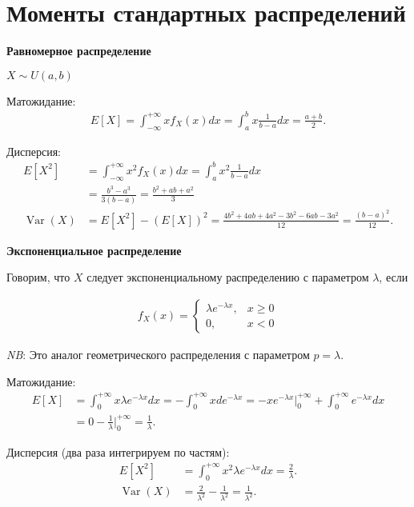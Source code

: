 \documentclass[12pt]{article}
\DeclareMathOperator{\Var}{Var}
\begin{document}
  \section{Моменты стандартных распределений}

  \textbf{Равномерное распределение}

  $X \sim U(a, b)$ 

  Матожидание:
  \begin{align*}
    E[X] = \int_{-\infty}^{+\infty} x f_X(x) dx = \int_{a}^{b} x \frac{1}{b - a} dx = \frac{a + b}{2}. 
  \end{align*}

  Дисперсия:
  \begin{align*}
    E[X^2] &= \int_{-\infty}^{+\infty} x^2 f_X(x) dx = \int_{a}^{b} x^2 \frac{1}{b - a} dx \\
           &= \frac{b^3 - a^3}{3(b - a)} = \frac{b^2 + ab + a^2}{3}\\
    \Var(X) &= E[X^2] - (E[X])^2 = \frac{4b^2 + 4ab + 4a^2 - 3b^2 - 6ab - 3a^2}{12} = \frac{(b - a)^2}{12}. 
  \end{align*}

  \textbf{Экспоненциальное распределение}

  Говорим, что $X$ следует экспоненциальному распределению с параметром $\lambda$, если

  \begin{align*}
    f_X(x) = \begin{cases}
      \lambda e^{-\lambda x}, &x \ge 0 \\
      0, &x < 0
    \end{cases}
  \end{align*}

  \emph{NB}: Это аналог геометрического распределения с параметром $p = \lambda$.

  Матожидание:
  \begin{align*}
    E[X] &= \int_0^{+\infty} x \lambda e^{-\lambda x} dx = - \int_0^{+\infty} x d e^{-\lambda x} = - x e^{-\lambda x} \bigg|_0^{+\infty} + \int_0^{+\infty} e^{-\lambda x} dx \\
    &= 0 - \frac{1}{\lambda} \bigg|_0^{+\infty} = \frac{1}{\lambda}.
  \end{align*}

  Дисперсия (два раза интегрируем по частям):
  \begin{align*}
    E[X^2] &= \int_0^{+\infty} x^2 \lambda e^{-\lambda x} dx = \frac{2}{\lambda}. \\
    \Var(X) &= \frac{2}{\lambda^2} - \frac{1}{\lambda^2} = \frac{1}{\lambda^2}.
  \end{align*}
\end{document}

